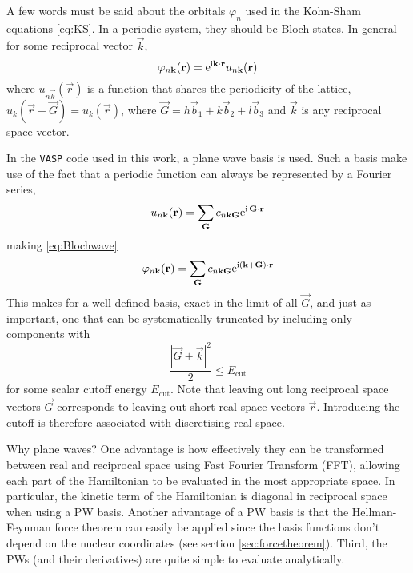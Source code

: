 \documentclass[11pt,bibliography=totoc,index=totoc]{scrbook}   %
\newcommand{\vasp}{{\texttt{VASP}}} %
\begin{document}
A few words must be said about the orbitals $\varphi_n$ used in the Kohn-Sham equations \eqref{eq:KS}.
In a periodic system, they should be Bloch states. In general for some reciprocal vector $\vec{k}$,
\begin{equation}
    \varphi_{n\boldsymbol{\mathrm{k}}}(\boldsymbol{\mathrm{r}}) = \mathrm{e}^{\mathrm{i}\boldsymbol{\mathrm{k}}\cdot\boldsymbol{\mathrm{r}}} u_{n\boldsymbol{\mathrm{k}}}(\boldsymbol{\mathrm{r}})
  \label{eq:Blochwave}
\end{equation}
where $u_{n\vec{k}}(\vec{r})$ is a function that shares the periodicity of the lattice, $u_k(\vec{r}+\vec{G}) = u_k(\vec{r})$,
where $\vec{G} = h\vec{b}_1 + k\vec{b}_2 + l\vec{b}_3$ and $\vec{k}$ is any reciprocal space vector.

In the {\vasp} code used in this work, a plane wave basis is used.
Such a basis make use of the fact that a periodic function can always be represented by a Fourier series, 
\begin{equation}
    u_{n\boldsymbol{\mathrm{k}}}(\boldsymbol{\mathrm{r}}) = \sum_{\boldsymbol{\mathrm{G}}} c_{n\boldsymbol{\mathrm{k}}\boldsymbol{\mathrm{G}}} \mathrm{e}^{\mathrm{i}\,\boldsymbol{\mathrm{G}}\cdot\boldsymbol{\mathrm{r}}}
\end{equation}
making \eqref{eq:Blochwave}
\begin{equation}
    \varphi_{n\boldsymbol{\mathrm{k}}}(\boldsymbol{\mathrm{r}}) = \sum_{\boldsymbol{\mathrm{G}}} c_{n\boldsymbol{\mathrm{k}}\boldsymbol{\mathrm{G}}} \mathrm{e}^{\mathrm{i}(\boldsymbol{\mathrm{k}}+\boldsymbol{\mathrm{G}})\cdot\boldsymbol{\mathrm{r}}}
  \label{eq:pwbasis}
\end{equation}
This makes for a well-defined basis, exact in the limit of all $\vec{G}$, and just as important, 
one that can be systematically truncated by including only components with 
\begin{equation}
  \frac{|\vec{G}+\vec{k}|^2}{2} \leq E_{\text{cut}}
\end{equation}
for some scalar cutoff energy $E_{\text{cut}}$. 
Note that leaving out long reciprocal space vectors $\vec{G}$ corresponds to leaving out short real space vectors $\vec{r}$. 
Introducing the cutoff is therefore associated with discretising real space.

Why plane waves?
One advantage is how effectively they can be transformed between real and reciprocal space using Fast Fourier Transform (FFT),
allowing each part of the Hamiltonian to be evaluated in the most appropriate space.
In particular, the kinetic term of the Hamiltonian is diagonal in reciprocal space when using a PW basis.
Another advantage of a PW basis is that the Hellman-Feynman force theorem can easily be applied since the basis functions don't depend on the nuclear coordinates (see section \ref{sec:forcetheorem}). 
Third, the PWs (and their derivatives) are quite simple to evaluate analytically.\cite[187]{Kohanoff:2006}
\end{document}
